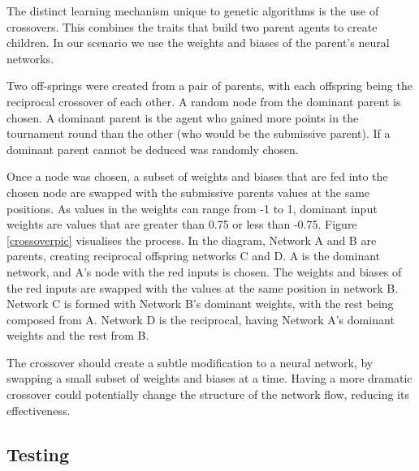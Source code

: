 \documentclass[12pt,a4paper]{article}
\begin{document}
            The distinct learning mechanism unique to genetic algorithms is the use of crossovers. This combines the traits that build two parent agents to create children. In our scenario we use the weights and biases of the parent's neural networks.

            Two off-springs were created from a pair of parents, with each offspring being the reciprocal crossover of each other. 
            A random node from the dominant parent is chosen. A dominant parent is the agent who gained more points in the tournament round than the other (who would be the submissive parent). If a dominant parent cannot be deduced was randomly chosen. 

            Once a node was chosen, a subset of weights and biases that are fed into the chosen node are swapped with the submissive parents values at the same positions. As values in the weights can range from -1 to 1, dominant input weights are values that are greater than 0.75 or less than -0.75. Figure \ref{crossoverpic} visualises the process. In the diagram, Network A and B are parents, creating reciprocal offspring networks C and D. A is the dominant network, and A's node with the red inputs is chosen. The weights and biases of the red inputs are swapped with the values at the same position in network B. Network C is formed with Network B's dominant weights, with the rest being composed from A. Network D is the reciprocal, having Network A's dominant weights and the rest from B.

            The crossover should create a subtle modification to a neural network, by swapping a small subset of weights and biases at a time. Having a more dramatic crossover could potentially change the structure of the network flow, reducing its effectiveness. 
            

    \subsection{Testing}
\end{document}
